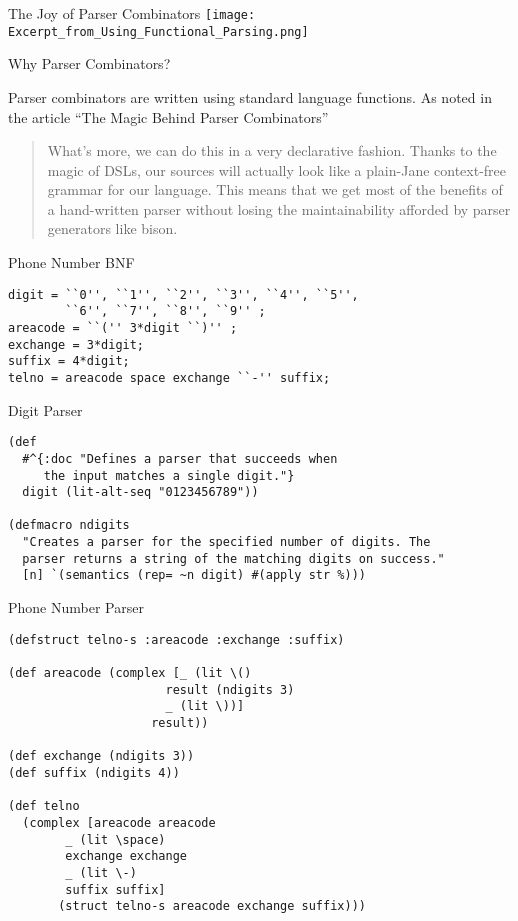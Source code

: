 \documentclass[presentation]{beamer}
\begin{document}
\begin{frame}{The Joy of Parser Combinators}
\texttt{[image: Excerpt\_from\_Using\_Functional\_Parsing.png]}
\end{frame}

\begin{frame}{Why Parser Combinators?}

  Parser combinators are written using standard language functions. As
  noted in the article ``The Magic Behind Parser Combinators''\cite{Spiewak}

\begin{quotation}
  What's more, we can do this in a very declarative fashion.  Thanks
  to the magic of DSLs, our sources will actually look like a
  plain-Jane context-free grammar for our language.  This means that
  we get most of the benefits of a hand-written parser without losing
  the maintainability afforded by parser generators like bison.
\end{quotation}
\end{frame}

%
%
\begin{frame}[fragile]{Phone Number \ac{BNF}}
\begin{verbatim}
digit = ``0'', ``1'', ``2'', ``3'', ``4'', ``5'',
	    ``6'', ``7'', ``8'', ``9'' ;
areacode = ``('' 3*digit ``)'' ;
exchange = 3*digit;
suffix = 4*digit;
telno = areacode space exchange ``-'' suffix;
\end{verbatim}
\end{frame}


\begin{frame}[fragile]{Digit Parser}
\begin{verbatim}
(def
  #^{:doc "Defines a parser that succeeds when
     the input matches a single digit."}
  digit (lit-alt-seq "0123456789"))

(defmacro ndigits
  "Creates a parser for the specified number of digits. The
  parser returns a string of the matching digits on success."
  [n] `(semantics (rep= ~n digit) #(apply str %)))
\end{verbatim}
\end{frame}


\begin{frame}[fragile]{Phone Number Parser}
\begin{verbatim}
(defstruct telno-s :areacode :exchange :suffix)

(def areacode (complex [_ (lit \()
				      result (ndigits 3)
				      _ (lit \))]
				    result))

(def exchange (ndigits 3))
(def suffix (ndigits 4))

(def telno
  (complex [areacode areacode
	    _ (lit \space)
	    exchange exchange
	    _ (lit \-)
	    suffix suffix]
	   (struct telno-s areacode exchange suffix)))
\end{verbatim}
\end{frame}
\end{document}
